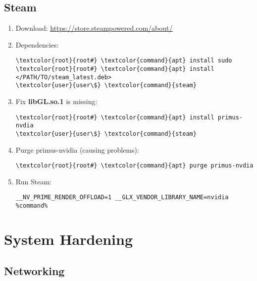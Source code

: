 \documentclass[10pt, a4paper, onecolumn, openany]{book} %
\begin{document}
\begin{enumerate}
\begin{itemize}
\begin{Verbatim}[commandchars=\\\{\}]
\end{Verbatim}
\end{itemize}
\end{enumerate}
\section{Steam}
\begin{enumerate}
    \item Download: \underline{\url{https://store.steampowered.com/about/}}
    \item Dependencies:
\begin{Verbatim}[commandchars=\\\{\}]
\textcolor{root}{root#} \textcolor{command}{apt} install sudo
\textcolor{root}{root#} \textcolor{command}{apt} install </PATH/TO/steam_latest.deb>
\textcolor{user}{user\$} \textcolor{command}{steam}
\end{Verbatim}
    \item Fix \textbf{libGL.so.1} is missing:
\begin{Verbatim}[commandchars=\\\{\}]
\textcolor{root}{root#} \textcolor{command}{apt} install primus-nvdia
\textcolor{user}{user\$} \textcolor{command}{steam}
\end{Verbatim}
    \item Purge primus-nvidia (causing problems):
\begin{Verbatim}[commandchars=\\\{\}]
\textcolor{root}{root#} \textcolor{command}{apt} purge primus-nvdia
\end{Verbatim}
    \item Run Steam:
\begin{verbatim}
__NV_PRIME_RENDER_OFFLOAD=1 __GLX_VENDOR_LIBRARY_NAME=nvidia %command%
\end{verbatim}
\end{enumerate}
\chapter{System Hardening}
\section{Networking}
\end{document}

